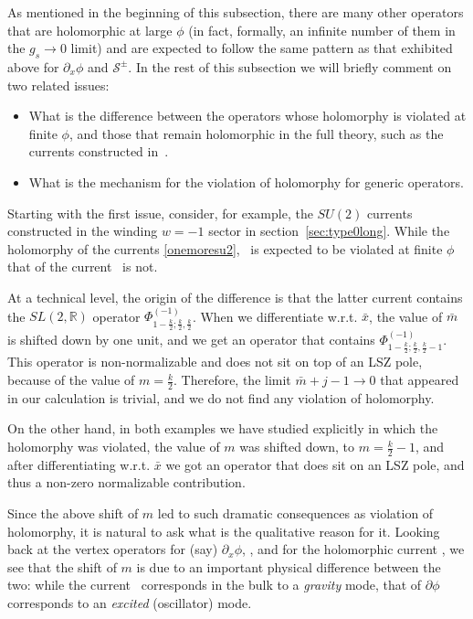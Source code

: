 \documentclass[12pt]{article}
\def\sltwo{\ensuremath{SL(2,\bR)}}
\newcommand{\bR}{{\mathbb R}}
\numberwithin{equation}{section}
\def\cS{\mathcal {S}} \def\cT{\mathcal {T}} \def\cU{\mathcal {U}}
\begin{document}
As mentioned in the beginning of this subsection, there are many other operators that are holomorphic at large $\phi$ (in fact, formally, an infinite number of them in the $g_s\to 0$ limit) and are expected to follow the same pattern as that exhibited above for $\partial_x\phi$ and $\cS^\pm$. In the rest of this subsection we will briefly comment on two related issues:
\begin{itemize}
\item What is the difference between the operators whose holomorphy is violated at finite $\phi$, and those that remain holomorphic in the full theory, such as the currents constructed in~.
\item What is the mechanism for the violation of holomorphy for generic operators.
\end{itemize}
Starting with the first issue, consider, for example, the $SU(2)$ currents constructed in the winding $w=-1$ sector in section~\ref{sec:type0long}. While the holomorphy of the currents \eqref{onemoresu2}, \finalthird\ is expected to be violated at finite $\phi$ that of the current \dualcurr\ is not. 

At a technical level, the origin of the difference is that the latter current contains the $\sltwo$ operator $\Phi^{(-1)}_{1-\frac{k}{2};\frac{k}{2},\frac{k}{2}}$. When we differentiate w.r.t. $\bar x$, the value of $\bar m$ is shifted down by one unit, and we get an operator that contains $\Phi^{(-1)}_{1-\frac{k}{2};\frac{k}{2},\frac{k}{2}-1}$. This operator is non-normalizable and does not sit on top of an LSZ pole, because of the value of $m=\frac{k}{2}$. Therefore, the limit $\bar m+j-1\to 0$ that appeared in our calculation is trivial, and we do not find any violation of holomorphy. 

On the other hand, in both examples we have studied explicitly in which the holomorphy was violated, the value of $m$ was shifted down, to $m=\frac{k}{2}-1$, and after differentiating w.r.t. $\bar x$ we got an operator that does sit on an LSZ pole, and thus a non-zero normalizable contribution. 

Since the above shift of $m$ led to such dramatic consequences as violation of holomorphy, it is natural to ask what is the qualitative reason for it. Looking back at the vertex operators for (say) $\partial_x\phi$, \dualbbzero, and for the holomorphic current \dualcurr, we see that the shift of $m$ is due to an important physical difference between the two: while the current \dualcurr\ corresponds in the bulk to a {\it gravity} mode, that of $\partial\phi$ corresponds to an {\it excited} (oscillator) mode. 
\end{document}
